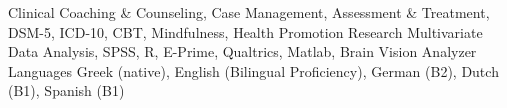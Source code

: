 

\begin{cvskills}
	\cvskill
		{Clinical} %
		{
			Coaching \& Counseling,
			Case Management, Assessment \& Treatment, DSM-5, ICD-10, CBT, Mindfulness, Health Promotion
		} %
	\cvskill
		{Research} %
		{
			Multivariate Data Analysis, SPSS, R, E-Prime, Qualtrics, Matlab, Brain Vision Analyzer
		} %
	\cvskill
		{Languages} %
		{Greek (native), English (Bilingual Proficiency), German (B2), Dutch (B1), Spanish (B1)} %
\end{cvskills}
